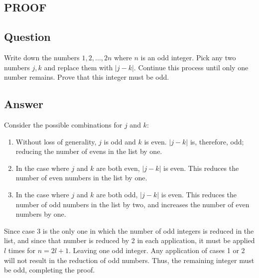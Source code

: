 \documentclass{article}
\begin{document}
\begin{center}
  \section*{PROOF}
\end{center}
  \subsection*{Question}
  Write down the numbers \(1,2,\dots,2n\) where \(n\) is an odd integer. 
  Pick any two numbers \(j,k\) and replace them with \(|j-k|\). Continue 
  this process until only one number remains. Prove that this integer 
  must be odd.
  \subsection*{Answer}
  Consider the possible combinations for \(j\) and \(k\):
  \begin{enumerate}
    \item Without loss of generality, \(j\) is odd and \(k\) is even. 
    \(|j-k|\) is, therefore, odd; reducing the number of evens in 
    the list by one.
    \item In the case where \(j\) and \(k\) are both even, \(|j-k|\) is even. 
    This reduces the number of even numbers in the list by one.
    \item In the case where \(j\) and \(k\) are both odd, \(|j-k|\) is even. 
    This reduces the number of odd numbers in the list by two, and 
    increases the number of even numbers by one.
  \end{enumerate}
  Since case 3 is the only one in which the number of odd integers is 
  reduced in the list, and since that number is reduced by 2 in each 
  application, it must be applied \(l\) times for \(n = 2l + 1\). Leaving one 
  odd integer. Any application of cases 1 or 2 will not result in the 
  reduction of odd numbers. Thus, the remaining integer must be odd, 
  completing the proof.
\end{document}
